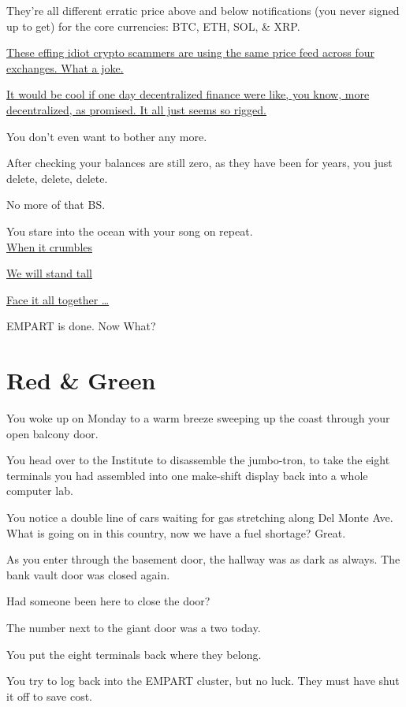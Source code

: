 \documentclass[17pt, twoside, a5paper, openright, extrafontsizes]{memoir}
\renewcommand{\emph}[1]{\ul{#1}}
\begin{document}
They're all different erratic price above and below notifications (you
never signed up to get) for the core currencies: BTC, ETH, SOL, \& XRP.

\emph{These effing idiot crypto scammers are using the same price feed
across four exchanges. What a joke.}

\emph{It would be cool if one day decentralized finance were like, you
know, more decentralized, as promised. It all just seems so rigged.}

You don't even want to bother any more.

After checking your balances are still zero, as they have been for
years, you just delete, delete, delete.

No more of that BS.

You stare into the ocean with your song on repeat.\\


\emph{When it crumbles}

\emph{We will stand tall}

\emph{Face it all together \ldots{}}\\

\par  

EMPART is done. Now What?


\chapter{Red \& Green}

You woke up on Monday to a warm breeze sweeping up the coast through
your open balcony door.

You head over to the Institute to disassemble the jumbo-tron, to take
the eight terminals you had assembled into one make-shift display back
into a whole computer lab.

You notice a double line of cars waiting for gas stretching along Del
Monte Ave. What is going on in this country, now we have a fuel
shortage? Great.

As you enter through the basement door, the hallway was as dark as
always. The bank vault door was closed again.

Had someone been here to close the door?

The number next to the giant door was a two today.

You put the eight terminals back where they belong.

You try to log back into the EMPART cluster, but no luck. They must have
shut it off to save cost.
\end{document}
